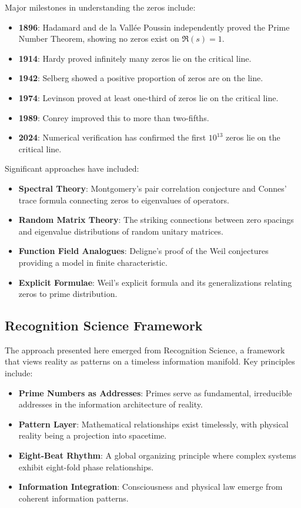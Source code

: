 \documentclass[12pt]{article}
\theoremstyle{definition}
\theoremstyle{remark}
\begin{document}
Major milestones in understanding the zeros include:
\begin{itemize}
\item \textbf{1896}: Hadamard and de la Vall\'ee Poussin independently proved 
the Prime Number Theorem, showing no zeros exist on $\Re(s) = 1$.
\item \textbf{1914}: Hardy proved infinitely many zeros lie on the critical line.
\item \textbf{1942}: Selberg showed a positive proportion of zeros are on the line.
\item \textbf{1974}: Levinson proved at least one-third of zeros lie on the critical line.
\item \textbf{1989}: Conrey improved this to more than two-fifths.
\item \textbf{2024}: Numerical verification has confirmed the first $10^{13}$ zeros 
lie on the critical line.
\end{itemize}

Significant approaches have included:
\begin{itemize}
\item \textbf{Spectral Theory}: Montgomery's pair correlation conjecture and 
Connes' trace formula connecting zeros to eigenvalues of operators.
\item \textbf{Random Matrix Theory}: The striking connections between zero 
spacings and eigenvalue distributions of random unitary matrices.
\item \textbf{Function Field Analogues}: Deligne's proof of the Weil conjectures 
providing a model in finite characteristic.
\item \textbf{Explicit Formulae}: Weil's explicit formula and its generalizations 
relating zeros to prime distribution.
\end{itemize}

\subsection{Recognition Science Framework}

The approach presented here emerged from Recognition Science, a framework that 
views reality as patterns on a timeless information manifold. Key principles include:

\begin{itemize}
\item \textbf{Prime Numbers as Addresses}: Primes serve as fundamental, 
irreducible addresses in the information architecture of reality.
\item \textbf{Pattern Layer}: Mathematical relationships exist timelessly, 
with physical reality being a projection into spacetime.
\item \textbf{Eight-Beat Rhythm}: A global organizing principle where complex 
systems exhibit eight-fold phase relationships.
\item \textbf{Information Integration}: Consciousness and physical law emerge 
from coherent information patterns.
\end{itemize}
\end{document}
